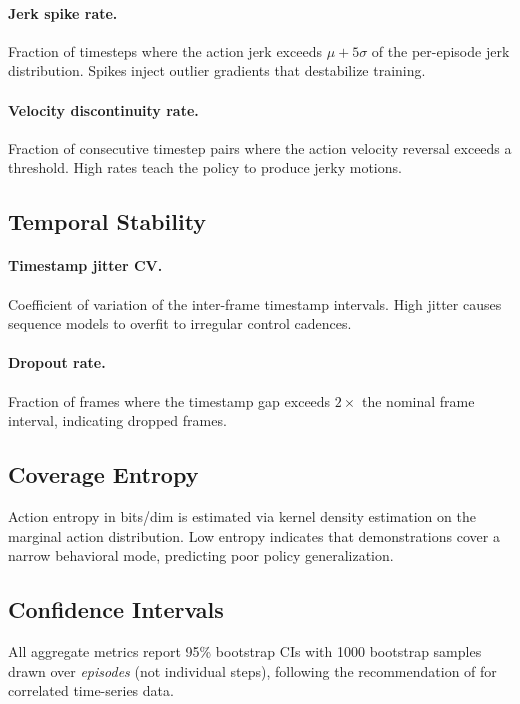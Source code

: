\documentclass[10pt,twocolumn]{article}
\begin{document}
\paragraph{Jerk spike rate.}
Fraction of timesteps where the action jerk exceeds $\mu + 5\sigma$ of the
per-episode jerk distribution. Spikes inject outlier gradients that
destabilize training.

\paragraph{Velocity discontinuity rate.}
Fraction of consecutive timestep pairs where the action velocity reversal
exceeds a threshold. High rates teach the policy to produce jerky motions.

\subsection{Temporal Stability}
\paragraph{Timestamp jitter CV.}
Coefficient of variation of the inter-frame timestamp intervals.
High jitter causes sequence models to overfit to irregular control cadences.

\paragraph{Dropout rate.}
Fraction of frames where the timestamp gap exceeds $2\times$ the nominal
frame interval, indicating dropped frames.

\subsection{Coverage Entropy}
Action entropy in bits/dim is estimated via kernel density estimation on
the marginal action distribution. Low entropy indicates that demonstrations
cover a narrow behavioral mode, predicting poor policy generalization.

\subsection{Confidence Intervals}
All aggregate metrics report 95\% bootstrap CIs with 1000 bootstrap samples
drawn over \emph{episodes} (not individual steps), following the
recommendation of \citet{agarwal2021deep} for correlated time-series data.

\end{document}

